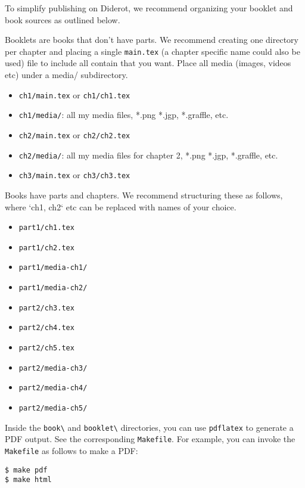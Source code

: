 \begin{note}
To simplify publishing on Diderot, we recommend organizing your booklet and book sources as outlined below. 

\begin{gram}[Booklets]
Booklets are books that don't have parts. We recommend creating one directory per chapter and placing a single \lstinline`main.tex` (a chapter specific name could also be used) file to include all contain that you want.  
%
Place all media (images, videos etc) under a media/ subdirectory. 
\begin{itemize}  
\item \lstinline`ch1/main.tex` or \lstinline`ch1/ch1.tex`
\item \lstinline`ch1/media/`: all my media files, *.png *.jgp, *.graffle, etc.
\item \lstinline`ch2/main.tex` or \lstinline`ch2/ch2.tex`
\item \lstinline`ch2/media/`: all my media files for chapter 2, *.png *.jgp, *.graffle, etc.
\item \lstinline`ch3/main.tex` or \lstinline`ch3/ch3.tex`
\end{itemize}
\end{gram}

\begin{gram}[Books]
Books have parts and chapters. We recommend structuring these as follows, where `ch1, ch2` etc can be replaced with names of your choice.
%
\begin{itemize}
\item \lstinline`part1/ch1.tex`
\item \lstinline`part1/ch2.tex`
\item \lstinline`part1/media-ch1/`
\item \lstinline`part1/media-ch2/`
\item \lstinline`part2/ch3.tex`
\item \lstinline`part2/ch4.tex`
\item \lstinline`part2/ch5.tex`
\item \lstinline`part2/media-ch3/`
\item \lstinline`part2/media-ch4/`
\item \lstinline`part2/media-ch5/`
\end{itemize}
   
\end{gram}


\begin{gram}
Inside the \lstinline`book\` and \lstinline`booklet\` directories, 
you can use \lstinline`pdflatex` to generate a PDF output.  See the corresponding \lstinline`Makefile`.
%
For example, you can  invoke the \lstinline`Makefile` as follows to make a PDF:
\begin{lstlisting}
$ make pdf
$ make html
\end{lstlisting}
\end{gram}



\end{note}
